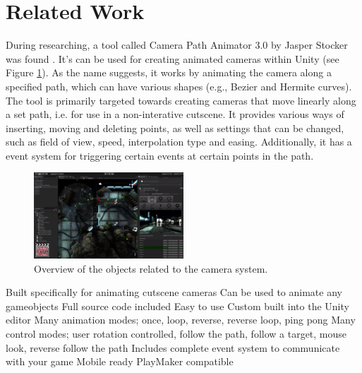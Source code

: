 \section{Related Work}

During researching, a tool called Camera Path Animator 3.0 by Jasper Stocker was found \cite{unity_camTool}. It's can be used for creating animated cameras within Unity (see Figure \ref{fig:unity_path_cam_tool}). As the name suggests, it works by animating the camera along a specified path, which can have various shapes (e.g., Bezier and Hermite curves). The tool is primarily targeted towards creating cameras that move linearly along a set path, i.e. for use in a non-interative cutscene. It provides various ways of inserting, moving and deleting points, as well as settings that can be changed, such as field of view, speed, interpolation type and easing. Additionally, it has a event system for triggering certain events at certain points in the path.


\begin{figure}[htbp]
\centering
\includegraphics[width=0.50\textwidth]{Pics/unity_path_cam_tool}
\caption{Overview of the objects related to the camera system.}
\label{fig:unity_path_cam_tool}
\end{figure}


Built specifically for animating cutscene cameras
Can be used to animate any gameobjects
Full source code included
Easy to use
Custom built into the Unity editor
Many animation modes; once, loop, reverse, reverse loop, ping pong
Many control modes; user rotation controlled, follow the path, follow a target, mouse look, reverse follow the path
Includes complete event system to communicate with your game
Mobile ready
PlayMaker compatible
